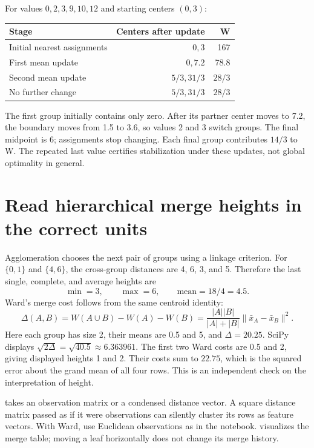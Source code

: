 For values $0,2,3,9,10,12$ and starting centers $(0,3)$:
\begin{center}\begin{tabular}{lrr}\toprule
Stage&Centers after update&W\\\midrule
Initial nearest assignments&$0,3$&167\\
First mean update&$0,7.2$&78.8\\
Second mean update&$5/3,31/3$&$28/3$\\
No further change&$5/3,31/3$&$28/3$\\\bottomrule\end{tabular}\end{center}
The first group initially contains only zero. After its partner center moves to 7.2, the boundary moves from 1.5 to 3.6,
so values 2 and 3 switch groups. The final midpoint is 6; assignments stop changing.
Each final group contributes $14/3$ to W. The repeated last value certifies stabilization under these updates, not global optimality in general.


\section{Read hierarchical merge heights in the correct units}
Agglomeration chooses the next pair of groups using a linkage criterion. For $\{0,1\}$ and $\{4,6\}$,
the cross-group distances are 4, 6, 3, and 5. Therefore the last single, complete, and average heights are
\[\min=3,\qquad\max=6,\qquad\text{mean}=18/4=4.5.\]
Ward's merge cost follows from the same centroid identity:
\[
\Delta(A,B)=W(A\cup B)-W(A)-W(B)
=\frac{|A||B|}{|A|+|B|}\|\bar x_A-\bar x_B\|^2.
\]
Here each group has size 2, their means are 0.5 and 5, and $\Delta=20.25$.
SciPy displays $\sqrt{2\Delta}=\sqrt{40.5}\approx6.363961$.
The first two Ward costs are 0.5 and 2, giving displayed heights 1 and 2.
Their costs sum to $22.75$, which is the squared error about the grand mean of all four rows.
This is an independent check on the interpretation of height.

 takes an observation matrix or a condensed distance vector. A square distance matrix passed as if it were
observations can silently cluster its rows as feature vectors. With Ward, use Euclidean observations as in the notebook.
 visualizes the merge table; moving a leaf horizontally does not change its merge history.

